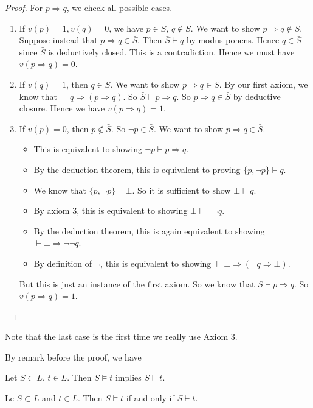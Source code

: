 \documentclass[a4paper]{article}
\begin{document}
\begin{proof}
  For $p\Rightarrow q$, we check all possible cases.
  \begin{enumerate}
    \item If $v(p) = 1, v(q) = 0$, we have $p\in \bar S$, $q\not\in \bar S$. We want to show $p\Rightarrow q\not\in \bar S$. Suppose instead that $p\Rightarrow q\in \bar S$. Then $\bar S \vdash q$ by modus ponens. Hence $q\in \bar S$ since $\bar S$ is deductively closed. This is a contradiction. Hence we must have $v(p\Rightarrow q) = 0$.
    \item If $v(q) = 1$, then $q\in \bar S$. We want to show $p\Rightarrow q\in \bar S$. By our first axiom, we know that $\vdash q\Rightarrow (p\Rightarrow q)$. So $\bar S \vdash p\Rightarrow q$. So $p\Rightarrow q \in \bar S$ by deductive closure. Hence we have $v(p \Rightarrow q) = 1$.
    \item If $v(p) = 0$, then $p\not\in \bar S$. So $\neg p\in \bar S$. We want to show $p\Rightarrow q\in \bar S$.
      \begin{itemize}
        \item
          This is equivalent to showing $\neg p \vdash p\Rightarrow q$.
        \item By the deduction theorem, this is equivalent to proving $\{p, \neg p\} \vdash q$.
        \item We know that $\{p, \neg p\} \vdash \bot$. So it is sufficient to show $\bot \vdash q$.
        \item By axiom 3, this is equivalent to showing $\bot \vdash \neg \neg q$.
        \item By the deduction theorem, this is again equivalent to showing $\vdash \bot \Rightarrow \neg \neg q$.
        \item By definition of $\neg$, this is equivalent to showing $\vdash \bot \Rightarrow (\neg q\Rightarrow \bot)$.
      \end{itemize}
      But this is just an instance of the first axiom. So we know that $\bar S\vdash p\Rightarrow q$. So $v(p\Rightarrow q) = 1$.
  \end{enumerate}
\end{proof}
Note that the last case is the first time we really use Axiom 3.

By remark before the proof, we have
\begin{cor}
  Let $S\subset L$, $t\in L$. Then $S\models t$ implies $S\vdash t$.
\end{cor}

\begin{thm}
  Le $S\subset L$ and $t\in L$. Then $S\models t$ if and only if $S\vdash t$.
\end{thm}
\end{document}
